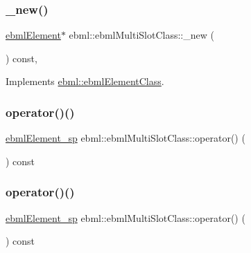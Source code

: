 \subsubsection{\texorpdfstring{\+\_\+new()}{\_new()}}
{\footnotesize\ttfamily \mbox{\hyperlink{classebml_1_1ebmlElement}{ebml\+Element}}$\ast$ ebml\+::ebml\+Multi\+Slot\+Class\+::\+\_\+new (\begin{DoxyParamCaption}{ }\end{DoxyParamCaption}) const\hspace{0.3cm}{\ttfamily [protected]}, {\ttfamily [virtual]}}



Implements \mbox{\hyperlink{classebml_1_1ebmlElementClass_a223ede6b8bc3c85251d2d73f0256fb45}{ebml\+::ebml\+Element\+Class}}.

\mbox{\label{classebml_1_1ebmlMultiSlotClass_a96e8fd5660f5802d19f140b0dc0d042a}} 
\subsubsection{\texorpdfstring{operator()()}{operator()()}\hspace{0.1cm}{\footnotesize\ttfamily [1/6]}}
{\footnotesize\ttfamily \mbox{\hyperlink{namespaceebml_adad533b7705a16bb360fe56380c5e7be}{ebml\+Element\+\_\+sp}} ebml\+::ebml\+Multi\+Slot\+Class\+::operator() (\begin{DoxyParamCaption}\item[{const \mbox{\hyperlink{namespaceebml_ae432575dfbb3e141ce897442794f0ca5}{slot\+Arg\+\_\+l}} \&}]{ }\end{DoxyParamCaption}) const}

\mbox{\label{classebml_1_1ebmlMultiSlotClass_a2a4b742e61f4efc0b8e9e686908424d2}} 
\subsubsection{\texorpdfstring{operator()()}{operator()()}\hspace{0.1cm}{\footnotesize\ttfamily [2/6]}}
{\footnotesize\ttfamily \mbox{\hyperlink{namespaceebml_adad533b7705a16bb360fe56380c5e7be}{ebml\+Element\+\_\+sp}} ebml\+::ebml\+Multi\+Slot\+Class\+::operator() (\begin{DoxyParamCaption}\item[{const \mbox{\hyperlink{namespaceebml_a4317d4c495715eced3ed448c2d05caeb}{slot\+Arg\+\_\+d}} \&}]{ }\end{DoxyParamCaption}) const}


